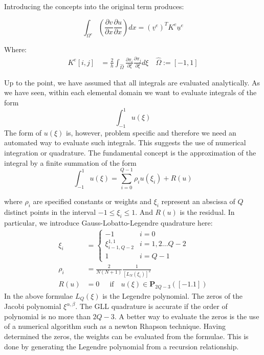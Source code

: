 \documentclass[
  a4paper,
  10pt]{article}
\begin{document}
Introducing the concepts into the original term produces:

\begin{equation}
\int_{\Omega^{e}} ( \frac{\partial v}{\partial x}\frac{\partial u}{\partial x})dx =(\underline{v}^{e})^{T}K^{e}\underline{u}^{e}
\end{equation}

Where: \begin{align}
K^{e}[i,j]&=\frac{2}{h}\int_{\hat{\Omega}}\frac{\partial \pi_{i}}{\partial\xi}\frac{\partial \pi_{j}}{\partial\xi} d\xi \quad \hat{\Omega} := [-1,1] 
\end{align}

Up to the point, we have assumed that all integrals are evaluated
analytically. As we have seen, within each elemental domain we want to
evaluate integrals of the form \begin{equation}
\int_{-1}^{1}u(\xi)
\end{equation} The form of \(u(\xi)\) is, however, problem specific and
therefore we need an automated way to evaluate such integrals. This
suggests the use of numerical integration or quadrature. The fundamental
concept is the approximation of the integral by a finite summation of
the form \begin{equation}
\int_{-1}^{1}u(\xi) = \sum_{i=0}^{Q-1}\rho_iu(\xi_i)+R(u)
\end{equation}

where \(\rho_i\) are specified constants or weights and \(\xi_i\)
represent an abscissa of \(Q\) distinct points in the interval
\(−1 \leq \xi_i \leq 1\). And \(R(u)\) is the residual. In particular,
we introduce Gauss-Lobatto-Legendre quadrature here: \begin{align}
    \xi_i &= 
    \begin{cases} 
      -1 & i= 0 \\
      \xi_{i-1,Q-2}^{1,1} & i=1,2... Q-2 \\
      1 & i = Q-1 
   \end{cases}\\
   \rho_i&=\frac{2}{N(N+1)}\frac{1}{[L_N(\xi_i)]^2}\\
   R(u) &= 0 ~~~~~\text{ if }~~~ u(\xi)\in\mathbf{P}_{2Q-3}([-1.1])
\end{align} In the above formulae \(L_Q(\xi)\) is the Legendre
polynomial. The zeros of the Jacobi polynomial \(\xi^{\alpha,\beta}\).
The GLL quadrature is accurate if the order of polynomial is no more
than \(2Q-3\). A better way to evaluate the zeros is the use of a
numerical algorithm such as a newton Rhapson technique. Having
determined the zeros, the weights can be evaluated from the formulae.
This is done by generating the Legendre polynomial from a recursion
relationship.
\end{document}
